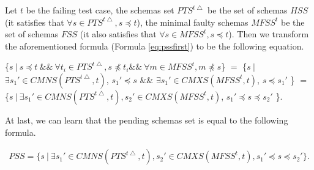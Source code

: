 {Let $t$ be the failing test case, the schemas set $PTS^{t\bigtriangleup}$ be the set of schemas $HSS$ (it satisfies that $\forall s \in PTS^{t\bigtriangleup}, s \preceq t $), the minimal faulty schemas $MFSS^{t}$ be the set of schemas $FSS$ (it also satisfies that $\forall s \in MFSS^{t}, s \preceq t $). Then we transform the aforementioned formula (Formula \ref{eq:pssfirst}) to be the following equation.

\{$s\ |\ s \preceq t\ \&\&\ \forall t_{i} \in PTS^{t\bigtriangleup}, s \npreceq t_{i} \&\&\ \forall m \in MFSS^{t}, m \npreceq s   $\} $=$  \{$ s\ |\ $ $\exists s_{1}' \in CMNS(PTS^{t\bigtriangleup}, t)$, $s_{1}' \preceq s$  $\&\&$ $\exists s_{1}' \in CMXS(MFSS^{t}, t)$, $s \preceq s_{1}'$  \} $=$  \{$ s\ |\ \exists s_{1}' \in CMNS(PTS^{t\bigtriangleup}, t), s_{2}' \in CMXS(MFSS^{t}, t)$, $s_{1}' \preceq s \preceq s_{2}'$ \}.

At last, we can learn that the pending schemas set is equal to the following formula.



\begin{equation}\label{eq:psssecond}
\begin{aligned}
PSS =  \{ s\ |\ \exists s_{1}' \in CMNS(PTS^{t\bigtriangleup}, t), s_{2}' \in CMXS(MFSS^{t}, t),  s_{1}' \preceq s \preceq s_{2}' \}.
\end{aligned}
\end{equation}

}
